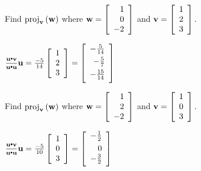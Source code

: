 \begin{enumialphparenastyle}

\begin{ex}  Find $\mbox{proj}_{{\bf v}}\left( {\bf w}\right) $ where ${\bf w}=\left[
\begin{array}{r}
1 \\
0 \\
-2
\end{array}
\right] $ and ${\bf v}=\left[
\begin{array}{r}
1 \\
2 \\
3
\end{array}
\right] .$
\begin{sol}
$\frac{\vect{u}\dotprod \vect{v}}{\vect{u}\dotprod \vect{u}}\vect{u}=\frac{-5}{14}\leftB \begin{array}{r}
1 \\
2 \\
3
\end{array}
\rightB =\leftB
\begin{array}{r}
-\vspace{0.05in}\frac{5}{14} \\
-\vspace{0.05in}\frac{5}{7} \\
-\vspace{0.05in}\frac{15}{14}
\end{array}
\rightB $
\end{sol}
\end{ex}

\begin{ex} Find $\mbox{proj}_{{\bf v}}\left( {\bf w}\right) $ where 
${\bf w}=\left[ 
\begin{array}{r}
1 \\
2 \\
-2
\end{array}
\right] $ and ${\bf v}=\left[
\begin{array}{r}
1 \\
0 \\
3
\end{array}
\right] .$
\begin{sol}
 $\frac{\vect{u}\dotprod \vect{v}}{\vect{u}\dotprod \vect{u}}\vect{u}=\frac{-5}{10}\leftB \begin{array}{r}
1 \\
0 \\
3
\end{array}
\rightB =\leftB
\begin{array}{r}
-\vspace{0.05in}\frac{1}{2} \\
0 \\
-\vspace{0.05in}\frac{3}{2}
\end{array}
\rightB $
\end{sol}
\end{ex}


\end{enumialphparenastyle}

